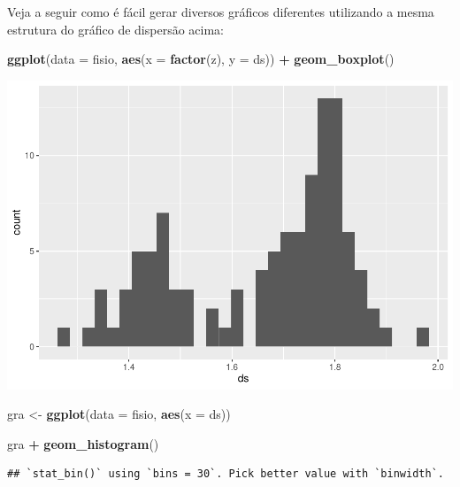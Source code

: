 \documentclass[
]{book}
\newenvironment{Shaded}{\begin{snugshade}}{\end{snugshade}}
\newcommand{\DataTypeTok}[1]{\textcolor[rgb]{0.13,0.29,0.53}{#1}}
\newcommand{\KeywordTok}[1]{\textcolor[rgb]{0.13,0.29,0.53}{\textbf{#1}}}
\newcommand{\NormalTok}[1]{#1}
\newcommand{\OperatorTok}[1]{\textcolor[rgb]{0.81,0.36,0.00}{\textbf{#1}}}
\newcommand{\StringTok}[1]{\textcolor[rgb]{0.31,0.60,0.02}{#1}}
\begin{document}
Veja a seguir como é fácil gerar diversos gráficos diferentes utilizando a mesma estrutura do gráfico de dispersão acima:

\begin{Shaded}
\begin{Highlighting}[]
\KeywordTok{ggplot}\NormalTok{(}\DataTypeTok{data =}\NormalTok{ fisio, }\KeywordTok{aes}\NormalTok{(}\DataTypeTok{x =} \KeywordTok{factor}\NormalTok{(z), }\DataTypeTok{y =}\NormalTok{ ds)) }\OperatorTok{+}
\StringTok{  }\KeywordTok{geom_boxplot}\NormalTok{()}
\end{Highlighting}
\end{Shaded}

\includegraphics{TudodoR_files/figure-latex/unnamed-chunk-192-1.pdf}

\begin{Shaded}
\begin{Highlighting}[]
\NormalTok{gra <-}\StringTok{ }\KeywordTok{ggplot}\NormalTok{(}\DataTypeTok{data =}\NormalTok{ fisio, }\KeywordTok{aes}\NormalTok{(}\DataTypeTok{x =}\NormalTok{ ds)) }
\end{Highlighting}
\end{Shaded}

\begin{Shaded}
\begin{Highlighting}[]
\NormalTok{gra }\OperatorTok{+}\StringTok{  }\KeywordTok{geom_histogram}\NormalTok{()}
\end{Highlighting}
\end{Shaded}

\begin{verbatim}
## `stat_bin()` using `bins = 30`. Pick better value with `binwidth`.
\end{verbatim}
\end{document}
